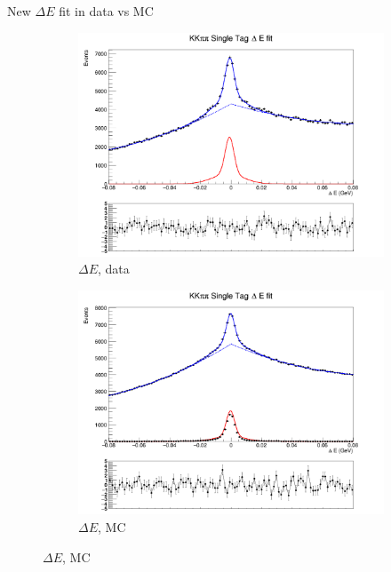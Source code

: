 \documentclass{beamer}
\begin{document}
\begin{frame}{New $\Delta E$ fit in data vs MC}
  \begin{figure}
    \centering
    \begin{subfigure}{0.5\textwidth}
      \centering
      \includegraphics[width=\textwidth]{KKpipiDeltaEPlotData.png}
      \caption{$\Delta E$, data}
    \end{subfigure}%
    \begin{subfigure}{0.5\textwidth}
      \centering
      \includegraphics[width=\textwidth]{KKpipiDeltaEPlotMC.png}
      \caption{$\Delta E$, MC}
    \end{subfigure}
  \end{figure}
\end{frame}
\end{document}
